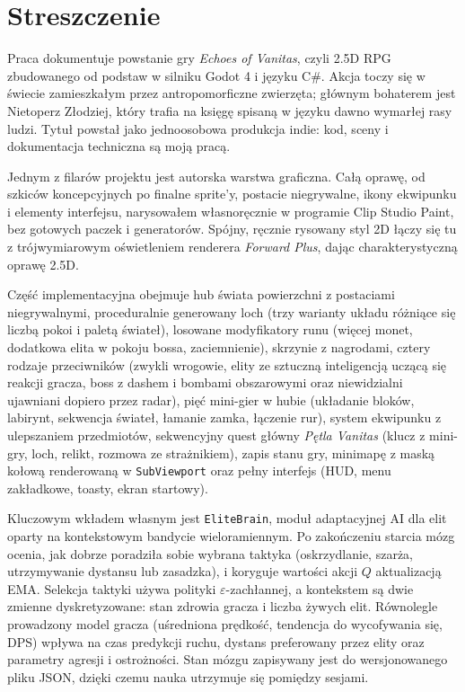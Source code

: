 
\section*{Streszczenie}
Praca dokumentuje powstanie gry \textit{Echoes of Vanitas}, czyli 2.5D RPG zbudowanego od podstaw w silniku Godot 4 i języku C\#. Akcja toczy się w świecie zamieszkałym przez antropomorficzne zwierzęta; głównym bohaterem jest Nietoperz Złodziej, który trafia na księgę spisaną w języku dawno wymarłej rasy ludzi. Tytuł powstał jako jednoosobowa produkcja indie: kod, sceny i dokumentacja techniczna są moją pracą.

Jednym z filarów projektu jest autorska warstwa graficzna. Całą oprawę, od szkiców koncepcyjnych po finalne sprite'y, postacie niegrywalne, ikony ekwipunku i elementy interfejsu, narysowałem własnoręcznie w programie Clip Studio Paint, bez gotowych paczek i generatorów. Spójny, ręcznie rysowany styl 2D łączy się tu z trójwymiarowym oświetleniem renderera \textit{Forward Plus}, dając charakterystyczną oprawę 2.5D.

Część implementacyjna obejmuje hub świata powierzchni z postaciami niegrywalnymi, proceduralnie generowany loch (trzy warianty układu różniące się liczbą pokoi i paletą świateł), losowane modyfikatory runu (więcej monet, dodatkowa elita w pokoju bossa, zaciemnienie), skrzynie z nagrodami, cztery rodzaje przeciwników (zwykli wrogowie, elity ze sztuczną inteligencją uczącą się reakcji gracza, boss z dashem i bombami obszarowymi oraz niewidzialni ujawniani dopiero przez radar), pięć mini-gier w hubie (układanie bloków, labirynt, sekwencja świateł, łamanie zamka, łączenie rur), system ekwipunku z ulepszaniem przedmiotów, sekwencyjny quest główny \textit{Pętla Vanitas} (klucz z mini-gry, loch, relikt, rozmowa ze strażnikiem), zapis stanu gry, minimapę z maską kołową renderowaną w \texttt{SubViewport} oraz pełny interfejs (HUD, menu zakładkowe, toasty, ekran startowy).

Kluczowym wkładem własnym jest \texttt{EliteBrain}, moduł adaptacyjnej AI dla elit oparty na kontekstowym bandycie wieloramiennym. Po zakończeniu starcia mózg ocenia, jak dobrze poradziła sobie wybrana taktyka (oskrzydlanie, szarża, utrzymywanie dystansu lub zasadzka), i koryguje wartości akcji $Q$ aktualizacją EMA. Selekcja taktyki używa polityki $\varepsilon$-zachłannej, a kontekstem są dwie zmienne dyskretyzowane: stan zdrowia gracza i liczba żywych elit. Równolegle prowadzony model gracza (uśredniona prędkość, tendencja do wycofywania się, DPS) wpływa na czas predykcji ruchu, dystans preferowany przez elity oraz parametry agresji i ostrożności. Stan mózgu zapisywany jest do wersjonowanego pliku JSON, dzięki czemu nauka utrzymuje się pomiędzy sesjami.

